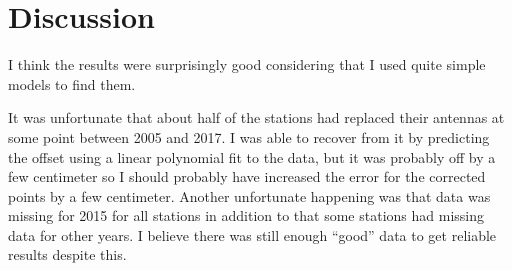 \documentclass[12pt,a4paper]{article}
\begin{document}
\section{Discussion}
I think the results were surprisingly good considering that I used quite simple models to find them.

It was unfortunate that about half of the stations had replaced their antennas at some point between 2005 and 2017.
I was able to recover from it by predicting the offset using a linear polynomial fit to the data, but it was probably off by a few centimeter so I should probably have increased the error for the corrected points by a few centimeter.
Another unfortunate happening was that data was missing for 2015 for all stations in addition to that some stations had missing data for other years.
I believe there was still enough ``good'' data to get reliable results despite this.
\end{document}
